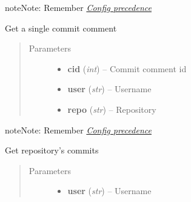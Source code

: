 \documentclass[letterpaper,10pt,english]{sphinxmanual}
\begin{document}
\begin{fulllineitems}
\begin{fulllineitems}
\begin{quote}
\begin{description}
\begin{itemize}
\end{itemize}

\end{description}\end{quote}

\begin{notice}{note}{Note:}
Remember {\hyperref[repos:config-precedence]{\emph{Config precedence}}}
\end{notice}

\end{fulllineitems}


\begin{fulllineitems}
\label{repos:pygithub3.services.repos.Commits.get_comment}
Get a single commit comment
\begin{quote}\begin{description}
\item[{Parameters}] \leavevmode\begin{itemize}
\item {} 
\textbf{cid} (\emph{int}) -- Commit comment id

\item {} 
\textbf{user} (\emph{str}) -- Username

\item {} 
\textbf{repo} (\emph{str}) -- Repository

\end{itemize}

\end{description}\end{quote}

\begin{notice}{note}{Note:}
Remember {\hyperref[repos:config-precedence]{\emph{Config precedence}}}
\end{notice}

\end{fulllineitems}


\begin{fulllineitems}
\label{repos:pygithub3.services.repos.Commits.list}
Get repository's commits
\begin{quote}\begin{description}
\item[{Parameters}] \leavevmode\begin{itemize}
\item {} 
\textbf{user} (\emph{str}) -- Username


\end{itemize}
\end{description}
\end{quote}
\end{fulllineitems}
\end{fulllineitems}
\end{document}
